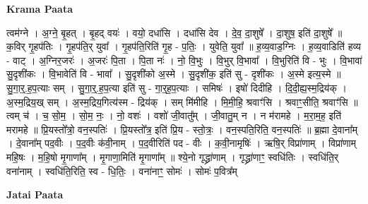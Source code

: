 \documentclass[17pt]{extarticle}
\begin{document}
\textbf{Krama Paata} \newline

त्वम॑ग्ने । अ॒ग्ने॒ बृ॒हत् । बृ॒हद् वयः॑ । वयो॒ दधा॑सि । दधा॑सि देव । दे॒व॒ दा॒शुषे᳚ । दा॒शुष॒ इति॑ दा॒शुषे᳚ ॥ क॒विर् गृ॒हप॑तिः । गृ॒हप॑ति॒र् युवा᳚ । गृ॒हप॑ति॒रिति॑ गृ॒ह - प॒तिः॒ । युवेति॒ युवा᳚ ॥ ह॒व्य॒वाड॒ग्निः । ह॒व्य॒वाडिति॑ हव्य - वाट् । अ॒ग्निर॒जरः॑ । अ॒जरः॑ पि॒ता । पि॒ता नः॑ । नो॒ वि॒भुः । वि॒भुर् वि॒भावा᳚ । वि॒भुरिति॑ वि - भुः । वि॒भावा॑ सु॒दृशी॑कः । वि॒भावेति॑ वि - भावा᳚ । सु॒दृशी॑को अ॒स्मे । सु॒दृशी॑क॒ इति॑ सु - दृशी॑कः । अ॒स्मे इत्य॒स्मे ॥ सु॒गा॒र्॒.ह॒प॒त्याः सम् । सु॒गा॒र्॒.ह॒प॒त्या इति॑ सु - गा॒र्॒ह॒प॒त्याः । समिषः॑ । इषो॑ दिदीहि । दि॒दी॒ह्य॒स्म॒द्रिय॑क् । अ॒स्म॒द्रिय॒ख् सम् । अ॒स्म॒द्रिय॒गित्य॑स्म - द्रिय॑क् । सम् मि॑मीहि । मि॒मी॒हि॒ श्रवाꣳ॑सि । श्रवाꣳ॒॒सीति॒ श्रवाꣳ॑सि ॥ त्वम् च॑ । च॒ सो॒म॒ । सो॒म॒ नः॒ । नो॒ वशः॑ । वशो॑ जी॒वातु᳚म् । जी॒वातु॒म् न । न म॑रामहे । म॒रा॒म॒ह॒ इति॑ मरामहे ॥ प्रि॒यस्तो᳚त्रो॒ वन॒स्पतिः॑ । प्रि॒यस्तो᳚त्र॒ इति॑ प्रि॒य - स्तो॒त्रः॒ । वन॒स्पति॒रिति॒ वन॒स्पतिः॑ ॥ ब्र॒ह्मा दे॒वाना᳚म् । दे॒वाना᳚म् पद॒वीः । प॒द॒वीः क॑वी॒नाम् । प॒द॒वीरिति॑ पद - वीः । क॒वी॒नामृषिः॑ । ऋषि॒र् विप्रा॑णाम् । विप्रा॑णाम् महि॒षः । म॒हि॒षो मृ॒गाणा᳚म् । मृ॒गाणा॒मिति॑ मृ॒गाणा᳚म् ॥ श्ये॒नो गृद्ध्रा॑णाम् । गृद्ध्रा॑णाꣳ॒॒ स्वधि॑तिः । स्वधि॑ति॒र् वना॑नाम् । स्वधि॑ति॒रिति॒ स्व - धि॒तिः॒ । वना॑नाꣳ॒॒ सोमः॑ । सोमः॑ प॒वित्र᳚म् \newline

\textbf{Jatai Paata} \newline
\end{document}
